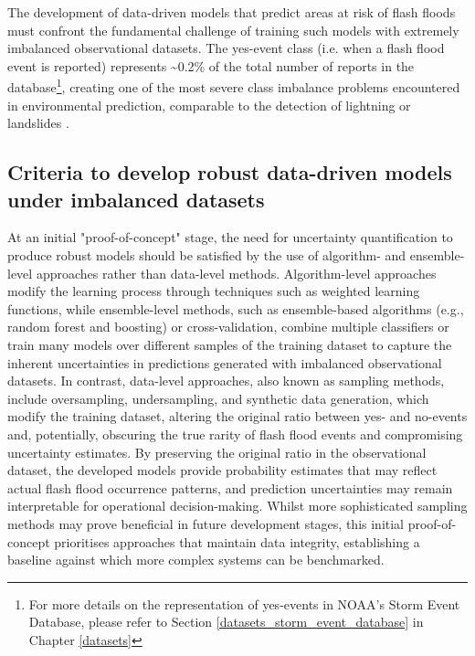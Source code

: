The development of data-driven models that predict areas at risk of flash floods must confront the fundamental challenge of training such models with extremely imbalanced observational datasets. The yes-event class (i.e. when a flash flood event is reported) represents \sim0.2\% of the total number of reports in the database\footnote{For more details on the representation of yes-events in NOAA's Storm Event Database, please refer to Section \ref{datasets_storm_event_database} in Chapter \ref{datasets}}, creating one of the most severe class imbalance problems encountered in environmental prediction, comparable to the detection of lightning \citep{Cavaiola_2024} or landslides \citep{Xu_2022, Agrawal_2017, Zhang_2022, Gupta_2023}. 

\subsection{Criteria to develop robust data-driven models under imbalanced datasets}

At  an initial "proof-of-concept" stage, the need for uncertainty quantification to produce robust models should be satisfied by the use of algorithm- and ensemble-level approaches rather than data-level methods. Algorithm-level approaches modify the learning process through techniques such as weighted learning functions, while ensemble-level methods, such as ensemble-based algorithms (e.g., random forest and boosting) or cross-validation, combine multiple classifiers or train many models over different samples of the training dataset to capture the inherent uncertainties in predictions generated with imbalanced observational datasets. In contrast, data-level approaches, also known as sampling methods, include oversampling, undersampling, and synthetic data generation, which modify the training dataset, altering the original ratio between yes- and no-events and, potentially, obscuring the true rarity of flash flood events and compromising uncertainty estimates. By preserving the original ratio in the observational dataset, the developed models provide probability estimates that may reflect actual flash flood occurrence patterns, and prediction uncertainties may remain interpretable for operational decision-making. Whilst more sophisticated sampling methods may prove beneficial in future development stages, this initial proof-of-concept prioritises approaches that maintain data integrity, establishing a baseline against which more complex systems can be benchmarked.

